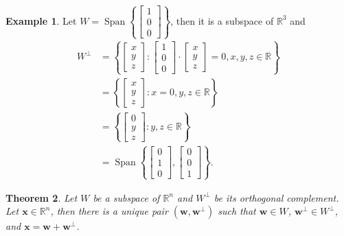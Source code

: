 \documentclass[12pt,letterpaper]{book}
\numberwithin{equation}{section}
\newtheorem{thm}{\textbf{Theorem}}[section]
\theoremstyle{definition}
\newtheorem{example}[thm]{\textbf{Example}}
\newcommand{\vw}{\bm{w}}
\newcommand{\vx}{\bm{x}}
\newcommand{\Span}{\operatorname{Span}}
\begin{document}
\begin{example}\label{first ortho}
Let $W=\Span \left\{\left[\begin{array}{r} 1 \\ 0 \\ 0 \end{array}\right]\right\}$, then it is a subspace of $\mathbb{R}^3$ and
\begin{align*}W^\perp&=\left\{\left[\begin{array}{r} x \\ y \\ z \end{array}\right]:  \left[\begin{array}{r} 1 \\ 0 \\ 0 \end{array}\right]\cdot \left[\begin{array}{r} x \\ y \\ z \end{array}\right]=0, x,y,z\in \mathbb{R}\right\}\\
&=\left\{\left[\begin{array}{r} x \\ y \\ z \end{array}\right]:  x=0,y,z\in \mathbb{R}\right\}\\
&=\left\{\left[\begin{array}{r} 0 \\ y \\ z \end{array}\right]:  y,z\in \mathbb{R}\right\}\\
&=\Span \left\{\left[\begin{array}{r} 0 \\ 1 \\ 0 \end{array}\right],\left[\begin{array}{r} 0 \\ 0 \\ 1 \end{array}\right] \right\}.
\end{align*}
\end{example}

\begin{thm}\label{orthdecthm}
Let $W$ be a subspace of $\mathbb{R}^n$ and $W^\perp$ be its orthogonal complement. Let $\vx\in \mathbb{R}^n$, then there is a unique pair $(\vw, \vw^\perp)$ such that $\vw\in W$, $\vw^\perp\in W^\perp$, and $\vx=\vw+\vw^\perp$.
\end{thm}
\end{document}
